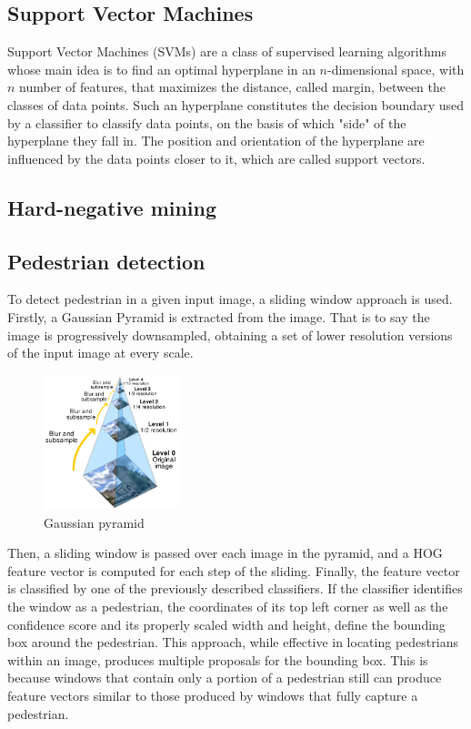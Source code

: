 \documentclass[journal,twocolumn]{IEEEtran}
\begin{document}
\subsection{Support Vector Machines}

Support Vector Machines (SVMs) are a class of supervised learning algorithms whose main idea is to find an optimal hyperplane in an $n$-dimensional space, with $n$ number of features, that maximizes the distance, called margin, between the classes of data points. Such an hyperplane constitutes the decision boundary used by a classifier to classify data points, on the basis of which "side" of the hyperplane they fall in. The position and orientation of the hyperplane are influenced by the data points closer to it, which are called support vectors.




\subsection{Hard-negative mining}

\subsection{Pedestrian detection}

To detect pedestrian in a given input image, a sliding window approach is used. Firstly, a Gaussian Pyramid is extracted
from the image. That is to say the image is progressively
downsampled, obtaining a set of lower resolution versions of the input image at every scale.

\begin{figure}[H]
\centering
\includegraphics[keepaspectratio,width=0.35\textwidth]{5}
\caption{Gaussian pyramid}
\end{figure}

Then, a sliding window is passed over each image in the
pyramid, and a HOG feature vector is computed for each step
of the sliding.
Finally, the feature vector is classified by one of the
previously described classifiers. If the classifier identifies the
window as a pedestrian, the coordinates of its top left corner
as well as the confidence score and its properly scaled width
and height, define the bounding box around the pedestrian.
This approach, while effective in locating pedestrians within
an image, produces multiple proposals for the bounding box.
This is because windows that contain only a portion of a
pedestrian still can produce feature vectors similar to those produced by windows that fully capture a pedestrian.
\end{document}
